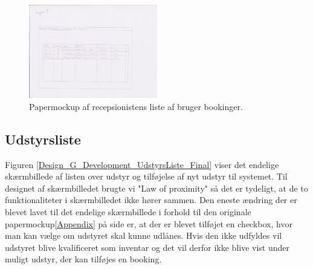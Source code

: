 \begin{figure}[h!]
  \centering
    \includegraphics[width=0.5\textwidth]{Appendix/GUI-Prototype/PaperMockup/GodkendBookinger_001}
  \caption{Papermockup af recepsionistens liste af bruger bookinger.}
\label{Design_G_Development_BookingListe}
\end{figure} 

\subsection{Udstyrsliste}
Figuren \ref{Design_G_Development_UdstyrsListe_Final} viser det endelige skærmbillede af listen over udstyr og tilføjelse af nyt udstyr til systemet. Til designet af skærmbilledet brugte vi "Law of proximity" så det er tydeligt, at de to funktionaliteter i skærmbilledet ikke hører sammen. Den eneste ændring der er blevet lavet til det endelige skærmbillede  i forhold til den originale papermockup\ref{Appendix} på side \pageref{Appendix} er, at der er blevet tilføjet en checkbox, hvor man kan vælge om udstyret skal kunne udlånes. Hvis den ikke udfyldes vil udstyret blive kvalificeret som inventar og det vil derfor ikke blive vist under muligt udstyr, der kan tilføjes en booking. 

